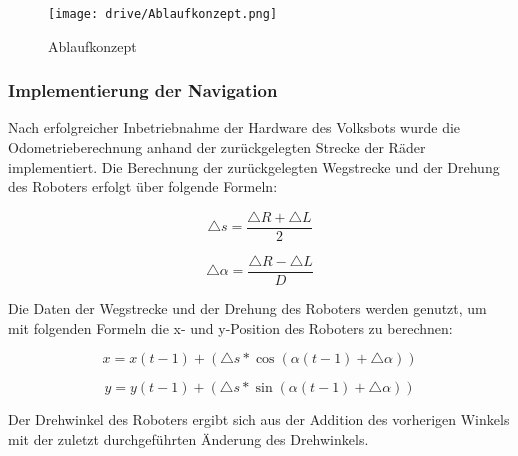 \newpage

\begin{figure}[h!]
 \centering
		\texttt{[image: drive/Ablaufkonzept.png]}
	\caption{Ablaufkonzept}
	\label{fig:Ablaufkonzept}
\end{figure}


\subsubsection{Implementierung der Navigation}
Nach erfolgreicher Inbetriebnahme der Hardware des Volksbots wurde die Odometrieberechnung anhand der zurückgelegten Strecke der Räder implementiert. Die Berechnung der zurückgelegten Wegstrecke und der Drehung des Roboters erfolgt über folgende Formeln\cite[S. 1]{Der:2000}:

\begin{equation}
\triangle s = \dfrac{\triangle R + \triangle L}{2}
\end{equation}
 
\begin{equation}
\triangle \alpha = \dfrac{\triangle R - \triangle L}{D}
\end{equation} 

Die Daten der Wegstrecke und der Drehung des Roboters werden genutzt, um mit folgenden Formeln die x- und y-Position des Roboters zu berechnen:

\begin{equation}
x = x(t-1) + (\triangle s * \cos (\alpha (t-1) + \triangle \alpha))
\end{equation} 

\begin{equation}
y = y(t-1) + (\triangle s * \sin (\alpha (t-1) + \triangle \alpha))
\end{equation} 

Der Drehwinkel des Roboters ergibt sich aus der Addition des vorherigen Winkels mit der zuletzt durchgeführten Änderung des Drehwinkels.



